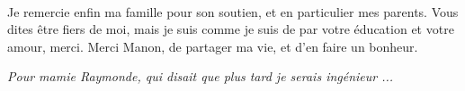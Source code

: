   \paragraph{}
  Je remercie enfin ma famille pour son soutien, et en particulier mes parents.
  Vous dites être fiers de moi, mais je suis comme je suis de par votre éducation et votre amour, merci.
  Merci Manon, de partager ma vie, et d'en faire un bonheur.

\begin{flushright}
    \textit{Pour mamie Raymonde, qui disait que plus tard je serais ingénieur ...}
\end{flushright}